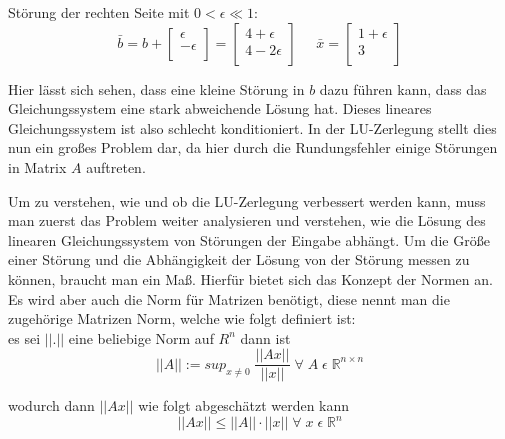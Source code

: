 \documentclass[course=erap]{aspdoc}
\begin{document}
Störung der rechten Seite mit $ 0 < \epsilon \ll 1$:
  \begin{equation}
    \label{absBeis2}
    \bar{b} = b + 
    \begin{bmatrix}
    \epsilon \\
    -\epsilon\\
    \end{bmatrix}
    = \begin{bmatrix}
    4 + \epsilon\\
    4- 2\epsilon\\
    \end{bmatrix}
    \;\;\;\;\;
    \bar{x} = 
    \begin{bmatrix}
    1 + \epsilon \\
    3\\
    \end{bmatrix}
  \end{equation}

Hier lässt sich sehen, dass eine kleine Störung in $b$ dazu führen kann, 
dass das Gleichungssystem eine stark abweichende Lösung hat.
Dieses lineares Gleichungssystem ist also schlecht konditioniert. In der LU-Zerlegung stellt dies nun ein großes 
Problem dar, da hier durch die Rundungsfehler einige Störungen in Matrix $A$ auftreten.

Um zu verstehen, wie und ob die LU-Zerlegung verbessert werden kann, muss man 
zuerst das Problem weiter analysieren und verstehen, wie die Lösung des linearen 
Gleichungssystem von Störungen der Eingabe abhängt. 
Um die Größe einer Störung und die Abhängigkeit der Lösung von der Störung messen zu 
können, braucht man ein Maß. Hierfür bietet sich das Konzept der Normen an. Es wird aber 
auch die Norm für Matrizen benötigt, diese nennt man die zugehörige Matrizen Norm, 
welche wie folgt definiert ist: \\
es sei $||.||$ eine beliebige Norm auf $R^n$ dann ist  
  \begin{equation}
    \label{norm}
    ||A|| := sup_{x\neq 0}\;\frac{||Ax||}{||x||}\; \forall\; A \;\epsilon \;\mathbb{R}^{n \times n}
  \end{equation}

wodurch dann $||Ax||$ wie folgt abgeschätzt werden kann
  \begin{equation}
    \label{norm}
    ||Ax|| \leq ||A|| \cdot ||x||\;  \forall\; x \;\epsilon \;\mathbb{R}^n 
  \end{equation}
\end{document}
